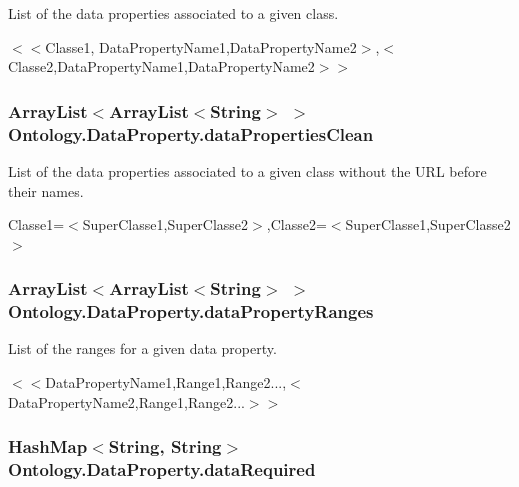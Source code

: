 List of the data properties associated to a given class. 

$<$$<$Classe1, DataPropertyName1,DataPropertyName2$>$,$<$Classe2,DataPropertyName1,DataPropertyName2$>$$>$ \hypertarget{class_ontology_1_1_data_property_a016e25b09967876b7191033daab24d2c}{
\subsubsection[{dataPropertiesClean}]{\setlength{\rightskip}{0pt plus 5cm}ArrayList$<$ArrayList$<$String$>$ $>$ {\bf Ontology.DataProperty.dataPropertiesClean}}}
\label{class_ontology_1_1_data_property_a016e25b09967876b7191033daab24d2c}


List of the data properties associated to a given class without the URL before their names. 

Classe1=$<$SuperClasse1,SuperClasse2$>$,Classe2=$<$SuperClasse1,SuperClasse2$>$ \hypertarget{class_ontology_1_1_data_property_a9ffdd8ee11bc8c9a2651e512da2485b7}{
\subsubsection[{dataPropertyRanges}]{\setlength{\rightskip}{0pt plus 5cm}ArrayList$<$ArrayList$<$String$>$ $>$ {\bf Ontology.DataProperty.dataPropertyRanges}}}
\label{class_ontology_1_1_data_property_a9ffdd8ee11bc8c9a2651e512da2485b7}


List of the ranges for a given data property. 

$<$$<$DataPropertyName1,Range1,Range2...,$<$DataPropertyName2,Range1,Range2...$>$$>$ \hypertarget{class_ontology_1_1_data_property_aa8750eab83c0207b3acc8b87581e84c7}{
\subsubsection[{dataRequired}]{\setlength{\rightskip}{0pt plus 5cm}HashMap$<$String, String$>$ {\bf Ontology.DataProperty.dataRequired}}}
\label{class_ontology_1_1_data_property_aa8750eab83c0207b3acc8b87581e84c7}



